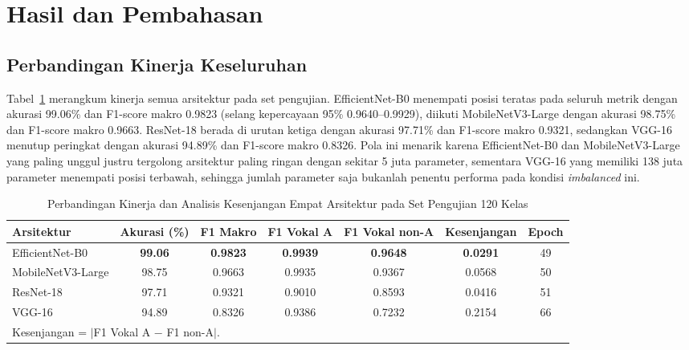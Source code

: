 \documentclass[conference]{IEEEtran}
\begin{document}
\section{Hasil dan Pembahasan}
\label{sec:results}

\subsection{Perbandingan Kinerja Keseluruhan}

Tabel~\ref{tab:results} merangkum kinerja semua arsitektur pada
set pengujian.
EfficientNet-B0 menempati posisi teratas pada seluruh metrik dengan
akurasi 99.06\% dan F1-score makro 0.9823 (selang kepercayaan 95\%
0.9640--0.9929), diikuti MobileNetV3-Large dengan akurasi 98.75\%
dan F1-score makro 0.9663.
ResNet-18 berada di urutan ketiga dengan akurasi 97.71\% dan
F1-score makro 0.9321, sedangkan VGG-16 menutup peringkat dengan
akurasi 94.89\% dan F1-score makro 0.8326.
Pola ini menarik karena EfficientNet-B0 dan MobileNetV3-Large yang
paling unggul justru tergolong arsitektur paling ringan dengan
sekitar 5 juta parameter, sementara VGG-16 yang memiliki 138 juta
parameter menempati posisi terbawah, sehingga jumlah parameter saja
bukanlah penentu performa pada kondisi \textit{imbalanced} ini.

\begin{table}[t]
\caption{Perbandingan Kinerja dan Analisis Kesenjangan Empat Arsitektur pada Set Pengujian 120 Kelas}
\label{tab:results}
\begin{center}
\renewcommand{\arraystretch}{1.3}
\small
\begin{tabular}{lcccccc}
\toprule
\textbf{Arsitektur} & \textbf{Akurasi (\%)} & \textbf{F1 Makro}
  & \textbf{F1 Vokal A} & \textbf{F1 Vokal non-A}
  & \textbf{Kesenjangan} & \textbf{Epoch} \\
\midrule
EfficientNet-B0   & \textbf{99.06} & \textbf{0.9823} & \textbf{0.9939} & \textbf{0.9648} & \textbf{0.0291} & 49 \\
MobileNetV3-Large & 98.75          & 0.9663          & 0.9935          & 0.9367          & 0.0568          & 50 \\
ResNet-18         & 97.71          & 0.9321          & 0.9010          & 0.8593          & 0.0416          & 51 \\
VGG-16            & 94.89          & 0.8326          & 0.9386          & 0.7232          & 0.2154          & 66 \\
\bottomrule
\multicolumn{7}{l}{\footnotesize Kesenjangan = $|$F1 Vokal A $-$ F1 non-A$|$.}
\end{tabular}
\end{center}
\end{table}
\end{document}
